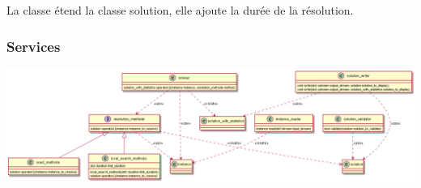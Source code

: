 La classe  étend la classe solution, 
elle ajoute la durée de la résolution.

\subsubsection{Services}

\includegraphics[width=\textwidth]{parts/analyse_et_conception/services}



